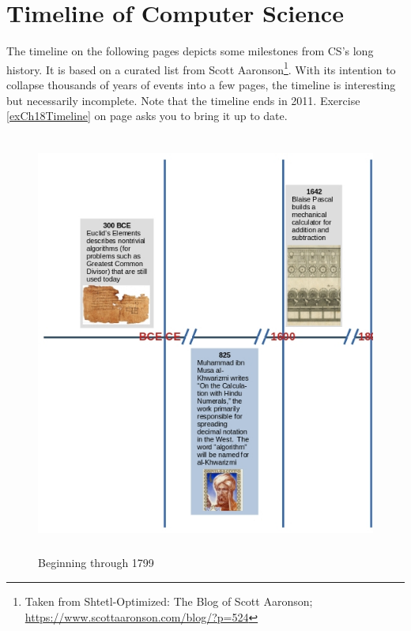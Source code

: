 
\chapter{Timeline of Computer Science}\label{appendixTimeline}

The timeline on the following pages depicts some milestones from CS's long history. It is based on a curated list from Scott Aaronson\footnote{Taken from Shtetl-Optimized: The Blog of Scott Aaronson; \url{https://www.scottaaronson.com/blog/?p=524}}. With its intention to collapse thousands of years of events into a few pages, the timeline is interesting but necessarily incomplete. Note that the timeline ends in 2011. Exercise \ref{exCh18Timeline} on page \pageref{exCh18Timeline} asks you to bring it up to date.

\begin{figure}[H]
	\begin{center}
		\caption{Beginning through 1799}
		\vskip 4pt
		\includegraphics[height=5.5in]{cs-timeline/CSHistoryTimeline-Part1a.jpg}
	\end{center}
\end{figure}


